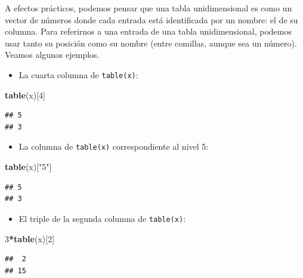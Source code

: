 \documentclass[]{book}
\newenvironment{Shaded}{\begin{snugshade}}{\end{snugshade}}
\newcommand{\DecValTok}[1]{\textcolor[rgb]{0.00,0.00,0.81}{#1}}
\newcommand{\KeywordTok}[1]{\textcolor[rgb]{0.13,0.29,0.53}{\textbf{#1}}}
\newcommand{\NormalTok}[1]{#1}
\newcommand{\OperatorTok}[1]{\textcolor[rgb]{0.81,0.36,0.00}{\textbf{#1}}}
\newcommand{\StringTok}[1]{\textcolor[rgb]{0.31,0.60,0.02}{#1}}
\providecommand{\tightlist}{%
  \setlength{\itemsep}{0pt}\setlength{\parskip}{0pt}}
\theoremstyle{definition}
\theoremstyle{definition}
\theoremstyle{definition}
\theoremstyle{remark}
\begin{document}
A efectos prácticos, podemos pensar que una tabla unidimensional es como un vector de números donde cada entrada está identificada por un nombre: el de su columna. Para referirnos a una entrada de una tabla unidimensional, podemos usar tanto su posición como su nombre (entre comillas, aunque sea un número). Veamos algunos ejemplos.

\begin{itemize}
\tightlist
\item
  La cuarta columna de \texttt{table(x)}:
\end{itemize}

\begin{Shaded}
\begin{Highlighting}[]
\KeywordTok{table}\NormalTok{(x)[}\DecValTok{4}\NormalTok{] }
\end{Highlighting}
\end{Shaded}

\begin{verbatim}
## 5 
## 3
\end{verbatim}

\begin{itemize}
\tightlist
\item
  La columna de \texttt{table(x)} correspondiente al nivel 5:
\end{itemize}

\begin{Shaded}
\begin{Highlighting}[]
\KeywordTok{table}\NormalTok{(x)[}\StringTok{"5"}\NormalTok{]}
\end{Highlighting}
\end{Shaded}

\begin{verbatim}
## 5 
## 3
\end{verbatim}

\begin{itemize}
\tightlist
\item
  El triple de la segunda columna de \texttt{table(x)}:
\end{itemize}

\begin{Shaded}
\begin{Highlighting}[]
\DecValTok{3}\OperatorTok{*}\KeywordTok{table}\NormalTok{(x)[}\DecValTok{2}\NormalTok{]}
\end{Highlighting}
\end{Shaded}

\begin{verbatim}
##  2 
## 15
\end{verbatim}
\end{document}
